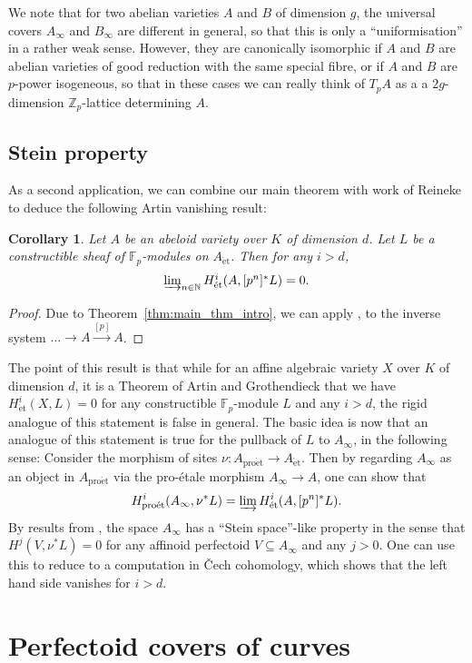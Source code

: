 \documentclass[10pt,oneside]{amsart}
\newtheorem{corollary}[theorem]{Corollary}
\theoremstyle{definition}
\newcommand{\et}{\operatorname{\acute{e}t}}
\newcommand{\proet}{\operatorname{pro\acute{e}t}}
\begin{document}
	We note that for two abelian varieties $A$ and $B$ of dimension $g$, the universal covers $A_\infty$ and $B_\infty$ are different in general, so that this is only a ``uniformisation'' in a rather weak sense. However, they are canonically isomorphic if $A$ and $B$ are abelian varieties of good reduction with the same special fibre, or if $A$ and $B$ are $p$-power isogeneous, so that in these cases we can really think of $T_pA$ as a a $2g$-dimension $\mathbb Z_p$-lattice determining $A$.
	\subsection{Stein property}
	As a second application, we can combine our main theorem with work of Reineke to deduce the following Artin vanishing result:
	\begin{corollary}
		Let $A$ be an abeloid variety over $K$ of dimension $d$. Let $L$ be a constructible sheaf of $\mathbb F_p$-modules on $A_{\et}$. Then for any $i>d$,
		\[\textstyle\varinjlim_{n\in \mathbb N}H_{\et}^i(A,[p^n]^{\ast}L)=0.\]
	\end{corollary}
	\begin{proof}
	Due to Theorem~\ref{thm:main_thm_intro}, we can apply \cite[Theorem 3.3]{Reineke}, to the inverse system $\dots \rightarrow A\xrightarrow{[p]}A$.
	\end{proof}
	The point of this result is that while for an affine algebraic variety $X$ over $K$ of dimension $d$, it is a Theorem of Artin and Grothendieck that we have $H_{\et}^i(X,L)=0$ for any constructible $\mathbb F_p$-module $L$ and any $i>d$, the rigid analogue of this statement is false in general. The basic idea is now that an analogue of this statement is true for the pullback of $L$ to $A_\infty$, in the following sense: Consider the morphism of sites $\nu:A_{\proet}\to A_{\et}$. Then by regarding $A_\infty$ as an object in $A_{\proet}$ via the pro-\'etale morphism $A_\infty\to A$, one can show that
	\[H^i_{\proet}(A_\infty,\nu^{\ast}L)=\varinjlim H^i_{\et}(A,[p^n]^{\ast}L). \]
	By results from \cite{p-adic_Hodge}, the space $A_\infty$ has a ``Stein space''-like property in the sense that $H^j(V,\nu^{\ast}L)=0$ for any affinoid perfectoid $V\subseteq A_\infty$ and any $j>0$. One can use this to reduce to a computation in \v{C}ech cohomology, which shows that the left hand side vanishes for $i>d$.
	\section{Perfectoid covers of curves}
	
\end{document}
